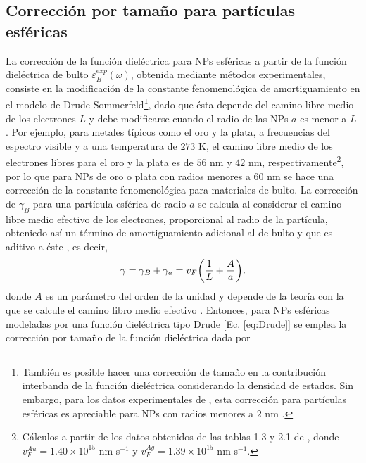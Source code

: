 \subsection{Corrección por tamaño para partículas esféricas}
\label{ssection:CorreccionTamano}

La corrección de la función dieléctrica para NPs esféricas a partir de la función dieléctrica de bulto $\varepsilon_B^{exp}(\omega)$, obtenida mediante métodos experimentales, consiste en la modificación de la constante fenomenológica de amortiguamiento en el modelo de Drude-Sommerfeld\footnote{También es posible hacer una corrección de tamaño en la contribución interbanda de la función dieléctrica considerando la densidad de estados. Sin embargo, para los datos experimentales de \cite{johnson1972constants}, esta corrección para partículas esféricas es apreciable para NPs con radios menores a $2$ nm \cite{mendoza2014determination}.}, dado que ésta depende del camino libre medio de los electrones $L$ y debe modificarse cuando el radio de las NPs $a$ es menor a $L$ \cite{kreibig1995clusters}. Por ejemplo, para metales típicos  como el oro y la plata, a frecuencias del espectro visible y a una temperatura de $273$ K, el camino libre medio de los electrones libres para el oro y la plata es  de $56$ nm  y $42$ nm, respectivamente\footnote{Cálculos a partir de los datos obtenidos de las tablas 1.3 y 2.1 de \cite{ashcroft1976solid}, donde $v_F^{Au} = 1.40\times 10^{15}$ nm s$^{-1}$ y $v_F^{Ag}=1.39\times 10^{15}$ nm s$^{-1}$.}, por lo que para NPs de oro o plata con radios menores a $60$ nm se hace una corrección de la constante fenomenológica para materiales de bulto. La corrección de $\gamma_B $ para una partícula esférica de radio $a$ se calcula al considerar el camino libre medio efectivo de los electrones, proporcional al radio de la partícula, obteniedo así un término de amortiguamiento adicional al de bulto y que es aditivo a éste \cite{kreibig1995clusters}, es decir,
%
	\begin{align*}
	 \gamma = \gamma_B+ \gamma_a = v_F \qty(\frac{1}{L}+\frac{A}{a}). 
	\end{align*}
%
donde $A$ es un parámetro del orden de la unidad \cite{noguez2007surface,mendoza2014determination} y depende de la teoría con la que se calcule el camino libro medio efectivo \cite{kreibig1995clusters}.  Entonces, para NPs esféricas modeladas por una función dieléctrica tipo Drude [Ec.  \eqref{eq:Drude}] se emplea  la corrección por tamaño de la función dieléctrica dada por 

